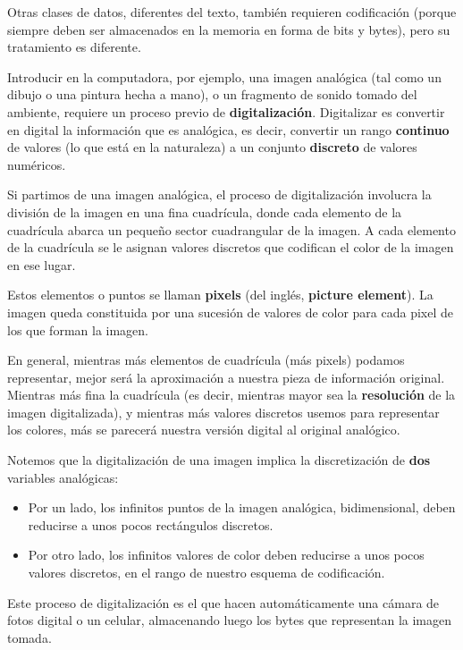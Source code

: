 \documentclass[spanish,a4paper,]{article}
\providecommand{\tightlist}{%
  \setlength{\itemsep}{0pt}\setlength{\parskip}{0pt}}
\begin{document}
Otras clases de datos, diferentes del texto, también requieren
codificación (porque siempre deben ser almacenados en la memoria en
forma de bits y bytes), pero su tratamiento es diferente.

Introducir en la computadora, por ejemplo, una imagen analógica (tal
como un dibujo o una pintura hecha a mano), o un fragmento de sonido
tomado del ambiente, requiere un proceso previo de
\textbf{digitalización}. Digitalizar es convertir en digital la
información que es analógica, es decir, convertir un rango
\textbf{continuo} de valores (lo que está en la naturaleza) a un
conjunto \textbf{discreto} de valores numéricos.

Si partimos de una imagen analógica, el proceso de digitalización
involucra la división de la imagen en una fina cuadrícula, donde cada
elemento de la cuadrícula abarca un pequeño sector cuadrangular de la
imagen. A cada elemento de la cuadrícula se le asignan valores discretos
que codifican el color de la imagen en ese lugar.

Estos elementos o puntos se llaman \textbf{pixels} (del inglés,
\textbf{picture element}). La imagen queda constituida por una sucesión
de valores de color para cada pixel de los que forman la imagen.

En general, mientras más elementos de cuadrícula (más pixels) podamos
representar, mejor será la aproximación a nuestra pieza de información
original. Mientras más fina la cuadrícula (es decir, mientras mayor sea
la \textbf{resolución} de la imagen digitalizada), y mientras más
valores discretos usemos para representar los colores, más se parecerá
nuestra versión digital al original analógico.

Notemos que la digitalización de una imagen implica la discretización de
\textbf{dos} variables analógicas:

\begin{itemize}
\tightlist
\item
  Por un lado, los infinitos puntos de la imagen analógica,
  bidimensional, deben reducirse a unos pocos rectángulos discretos.
\item
  Por otro lado, los infinitos valores de color deben reducirse a unos
  pocos valores discretos, en el rango de nuestro esquema de
  codificación.
\end{itemize}

Este proceso de digitalización es el que hacen automáticamente una
cámara de fotos digital o un celular, almacenando luego los bytes que
representan la imagen tomada.
\end{document}
